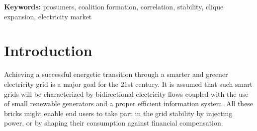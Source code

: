 \documentclass[journal]{IEEEtran}
\begin{document}
\IEEEpeerreviewmaketitle

{\bf Keywords:} prosumers, coalition formation, correlation, stability, clique expansion, electricity market
%
%
\section{Introduction}
\label{sec:introduction}




Achieving a successful energetic transition through a smarter and greener electricity grid is a major goal for the 21st century. It is assumed that such smart grids will be characterized by bidirectional electricity flows coupled with the use of small renewable generators and a proper efficient information system. All these bricks might enable end users to take part in the grid stability by injecting power, or by shaping their consumption against financial compensation.
\end{document}
